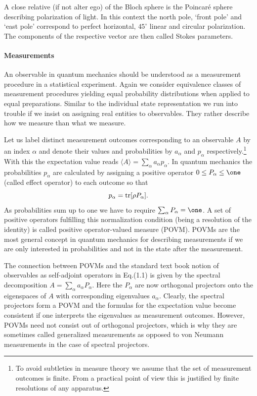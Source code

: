 \documentclass[11pt,a4paper]{article}
\theoremstyle{plain}
\theoremstyle{definition}
\theoremstyle{remark}
\numberwithin{equation}{section}
\begin{document}
A close relative (if not alter ego) of the Bloch sphere is the Poincar\'e sphere describing polarization of light. In this context the north pole, `front pole' and `east pole' correspond to perfect horizontal, $45^\circ$ linear and circular polarization. The components of the respective vector are then called Stokes parameters.

\paragraph{Measurements}
An observable in quantum mechanics should be understood as a measurement procedure in a statistical experiment. Again we consider equivalence classes of measurement procedures yielding equal probability distributions when applied to equal preparations. Similar to the individual state representation we run into trouble if we insist on assigning real entities to observables. They rather describe how we measure than what we measure.

Let us label distinct measurement outcomes corresponding to an observable $A$ by an index $\alpha$ and denote their values and probabilities by $a_\alpha$ and $p_\alpha$ respectively.\footnote{To avoid subtleties in measure theory we assume that the set of measurement outcomes is finite. From a practical point of view this is justified by finite resolutions of any apparatus.} With this the expectation value reads $\langle A\rangle=\sum_\alpha a_\alpha p_\alpha$. In quantum mechanics the probabilities $p_\alpha$ are calculated by assigning a positive operator $0\le P_\alpha\le \one$ (called effect operator) to each outcome so that
\begin{equation}
    p_\alpha = \operatorname{tr}[\rho P_\alpha].
\end{equation}
As probabilities sum up to one we have to require $\sum_\alpha P_\alpha=\one$. A set of positive operators fulfilling this normalization condition (being a resolution of the identity) is called positive operator-valued measure (POVM). POVMs are the most general concept in quantum mechanics for describing measurements if we are only interested in probabilities and not in the state after the measurement.

The connection between POVMs and the standard text book notion of observables as self-adjoint operators in Eq.(1.1) is given by the spectral decomposition $A=\sum_\alpha a_\alpha P_\alpha$. Here the $P_\alpha$ are now orthogonal projectors onto the eigenspaces of $A$ with corresponding eigenvalues $a_\alpha$. Clearly, the spectral projectors form a POVM and the formulas for the expectation value become consistent if one interprets the eigenvalues as measurement outcomes. However, POVMs need not consist out of orthogonal projectors, which is why they are sometimes called generalized measurements as opposed to von Neumann measurements in the case of spectral projectors.
\end{document}
